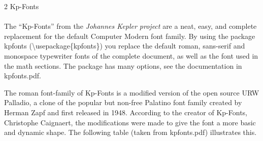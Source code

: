\documentclass{article}
\begin{document}
\frenchspacing

\noindent
{\LARGE 2 Kp-Fonts}\\
~\\
The ``Kp-Fonts'' from the \emph{Johannes Kepler project} are a neat, easy,
and complete replacement for the default Computer Modern font family.  By
using the package kpfonts (\textbackslash usepackage\{kpfonts\}) you replace
the default roman, sans-serif and monospace typewriter fonts of the complete
document, as well as the font used in the math sections.  The package has
many options, see the documentation in kpfonts.pdf.

The roman font-family of Kp-Fonts is a modified version of the open source
URW Palladio, a clone of the popular but
non-free Palatino font family created by Herman Zapf and first released
in 1948. 
According to the creator of Kp-Fonts, Christophe Caignaert, the
modifications were made to give the font a more basic and dynamic shape.
The following table (taken from \mbox{kpfonts.pdf}) illustrates this.
\end{document}
